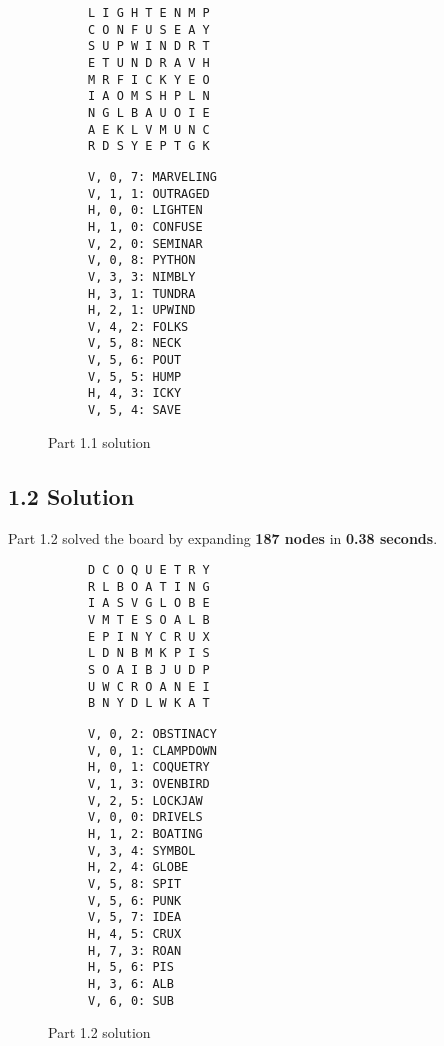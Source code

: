 \documentclass{article}
\begin{document}
\begin{figure}[H]
\centering
\begin{subfigure}{.5\textwidth}
\begin{verbatim}
L I G H T E N M P 
C O N F U S E A Y 
S U P W I N D R T 
E T U N D R A V H 
M R F I C K Y E O 
I A O M S H P L N 
N G L B A U O I E 
A E K L V M U N C 
R D S Y E P T G K
\end{verbatim}
\end{subfigure}%
\begin{subfigure}{.5\textwidth}
\begin{verbatim}
V, 0, 7: MARVELING
V, 1, 1: OUTRAGED
H, 0, 0: LIGHTEN
H, 1, 0: CONFUSE
V, 2, 0: SEMINAR
V, 0, 8: PYTHON
V, 3, 3: NIMBLY
H, 3, 1: TUNDRA
H, 2, 1: UPWIND
V, 4, 2: FOLKS
V, 5, 8: NECK
V, 5, 6: POUT
V, 5, 5: HUMP
H, 4, 3: ICKY
V, 5, 4: SAVE
\end{verbatim}
\end{subfigure}
\label{fig:board1.1}
\caption{Part 1.1 solution}
\end{figure}

\subsection{1.2 Solution}
Part 1.2 solved the board by expanding \textbf{187 nodes} in \textbf{0.38 seconds}.

\begin{figure}[H]
\centering
\begin{subfigure}{.5\textwidth}
\begin{verbatim}
D C O Q U E T R Y 
R L B O A T I N G 
I A S V G L O B E 
V M T E S O A L B 
E P I N Y C R U X 
L D N B M K P I S 
S O A I B J U D P 
U W C R O A N E I 
B N Y D L W K A T 
\end{verbatim}
\end{subfigure}%
\begin{subfigure}{.5\textwidth}
\begin{verbatim}
V, 0, 2: OBSTINACY
V, 0, 1: CLAMPDOWN
H, 0, 1: COQUETRY
V, 1, 3: OVENBIRD
V, 2, 5: LOCKJAW
V, 0, 0: DRIVELS
H, 1, 2: BOATING
V, 3, 4: SYMBOL
H, 2, 4: GLOBE
V, 5, 8: SPIT
V, 5, 6: PUNK
V, 5, 7: IDEA
H, 4, 5: CRUX
H, 7, 3: ROAN
H, 5, 6: PIS
H, 3, 6: ALB
V, 6, 0: SUB
\end{verbatim}
\end{subfigure}
\label{fig:board1.2}
\caption{Part 1.2 solution}
\end{figure}
\end{document}
